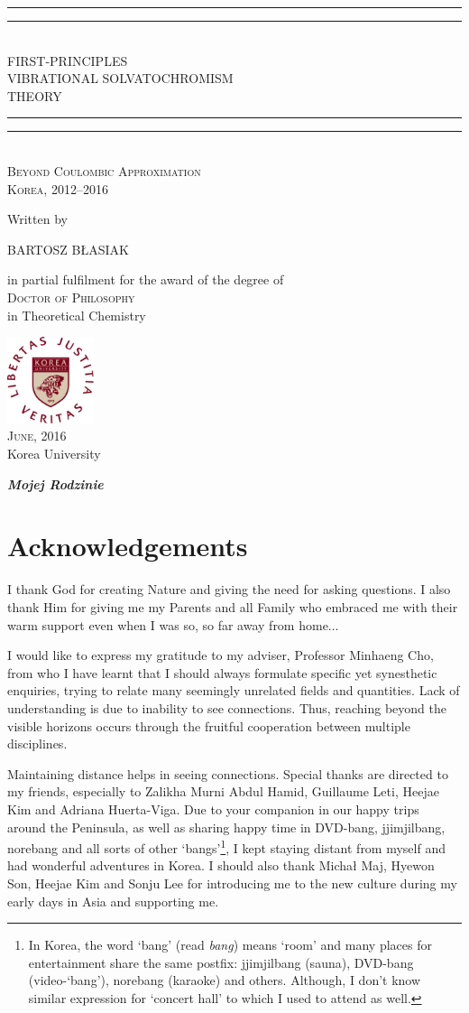 \documentclass[a4paper,titlepage,twoside,fleqn,12pt]{book}
\newcommand*{\fonttimes}{\fontfamily{ptm}\selectfont}
\newcommand\specialsection{%
  \titleformat{\chapter}[display]
{\large\bfseries}{\chaptertitlename\ \thechapter}{20pt}{\Huge}
}
\newenvironment{localspacing}[1]
      {\begin{spacing}{#1}}
      {\end{spacing}}
\newenvironment{dedication}
{
   \cleardoublepage
   \thispagestyle{empty}
   \vspace*{\stretch{1}}
   \hfill\begin{minipage}[t]{0.66\textwidth}
   \raggedright
}%
{
   \end{minipage}
   \vspace*{\stretch{3}}
   \clearpage
}
\newcommand*{\plogo}{\includegraphics[width=0.19\textwidth]{logos/KU_logo}}
\newcommand*{\titleGP}{\begingroup %
\centering %
{\fonttimes
\vspace*{0.0cm} %

\rule{\textwidth}{1.6pt}\vspace*{-\baselineskip}\vspace*{2pt} %
\rule{\textwidth}{0.4pt}\\[\baselineskip] %

{\LARGE FIRST-PRINCIPLES\\VIBRATIONAL SOLVATOCHROMISM\\THEORY\\[0.2\baselineskip]} %
\rule{\textwidth}{0.4pt}\vspace*{-\baselineskip}\vspace{3.2pt} %
\rule{\textwidth}{1.6pt}\\[\baselineskip] %

\scshape %
Beyond Coulombic Approximation\\[\baselineskip] %
Korea,  2012--2016\par %

\vspace*{2\baselineskip} %

Written by \\[\baselineskip]
{\Large BARTOSZ B{\L}ASIAK\par} %

\vfill
{in partial fulfilment for the award of the degree
 of} \\[2cm]
\textsc{\Large{{Doctor of Philosophy}}} \\[5pt]
{in Theoretical Chemistry} \vspace{0.4cm} \\[2cm]
 \vfill

\vfill %

\plogo \\[0.3\baselineskip] %
{\scshape June, 2016} \\[0.3\baselineskip] %
{\large Korea University}\par %

}
\endgroup}
\begin{document}
\frontmatter
\graphicspath{{figures/}}
\begin{localspacing}{1}
\titleGP
\end{localspacing}
\begin{dedication}
  \bf{ \emph{Mojej Rodzinie}}
\end{dedication}
{\specialsection
\chapter{Acknowledgements}
I thank God for creating Nature and giving the need for asking questions.
I also thank Him for giving me my Parents and all Family who embraced me
with their warm support even when I was so, so far away from home$\ldots$

I would like to express my gratitude to my adviser, Professor Minhaeng Cho,
from who I have learnt
that I should always formulate specific yet synesthetic enquiries,
trying to relate many seemingly unrelated fields and quantities.
Lack of understanding is due to inability to see connections.
Thus, reaching beyond the visible horizons occurs through the fruitful cooperation
between multiple disciplines.

Maintaining distance helps in seeing connections.
Special thanks are directed to my friends, especially to Zalikha Murni Abdul Hamid,
Guillaume Leti, Heejae Kim and Adriana Huerta\hyp{}Viga. Due to your companion
in our happy trips around the Peninsula, as well as
sharing happy time in DVD\hyp{bang}, jjimjilbang, norebang and all sorts of other `bangs'\footnote{In Korea,
the word `bang' (read \emph{bang}) means `room' and many places
for entertainment share the same postfix: jjimjilbang (sauna), DVD\hyp{}bang (video-`bang'),
norebang (karaoke) and others.
Although, I don't know similar expression for `concert hall' to which I used to attend
as well.},
I kept staying distant
from myself and had wonderful adventures in Korea. 
I should also 
thank Micha{\l} Maj, Hyewon Son, Heejae Kim and Sonju Lee for introducing me to the new culture
during my early days in Asia and supporting me.

}
\end{document}
